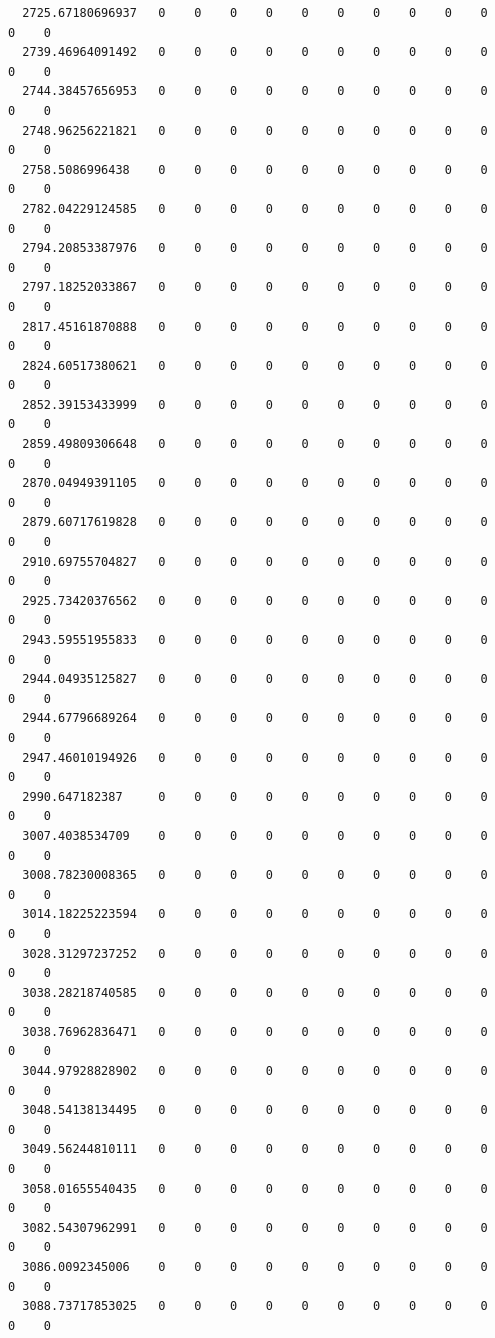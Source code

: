 \documentclass[
  letterpaper,
  DIV=11,
  numbers=noendperiod]{scrartcl}
\begin{document}
\begin{verbatim}
  2725.67180696937   0    0    0    0    0    0    0    0    0    0    0    0
  2739.46964091492   0    0    0    0    0    0    0    0    0    0    0    0
  2744.38457656953   0    0    0    0    0    0    0    0    0    0    0    0
  2748.96256221821   0    0    0    0    0    0    0    0    0    0    0    0
  2758.5086996438    0    0    0    0    0    0    0    0    0    0    0    0
  2782.04229124585   0    0    0    0    0    0    0    0    0    0    0    0
  2794.20853387976   0    0    0    0    0    0    0    0    0    0    0    0
  2797.18252033867   0    0    0    0    0    0    0    0    0    0    0    0
  2817.45161870888   0    0    0    0    0    0    0    0    0    0    0    0
  2824.60517380621   0    0    0    0    0    0    0    0    0    0    0    0
  2852.39153433999   0    0    0    0    0    0    0    0    0    0    0    0
  2859.49809306648   0    0    0    0    0    0    0    0    0    0    0    0
  2870.04949391105   0    0    0    0    0    0    0    0    0    0    0    0
  2879.60717619828   0    0    0    0    0    0    0    0    0    0    0    0
  2910.69755704827   0    0    0    0    0    0    0    0    0    0    0    0
  2925.73420376562   0    0    0    0    0    0    0    0    0    0    0    0
  2943.59551955833   0    0    0    0    0    0    0    0    0    0    0    0
  2944.04935125827   0    0    0    0    0    0    0    0    0    0    0    0
  2944.67796689264   0    0    0    0    0    0    0    0    0    0    0    0
  2947.46010194926   0    0    0    0    0    0    0    0    0    0    0    0
  2990.647182387     0    0    0    0    0    0    0    0    0    0    0    0
  3007.4038534709    0    0    0    0    0    0    0    0    0    0    0    0
  3008.78230008365   0    0    0    0    0    0    0    0    0    0    0    0
  3014.18225223594   0    0    0    0    0    0    0    0    0    0    0    0
  3028.31297237252   0    0    0    0    0    0    0    0    0    0    0    0
  3038.28218740585   0    0    0    0    0    0    0    0    0    0    0    0
  3038.76962836471   0    0    0    0    0    0    0    0    0    0    0    0
  3044.97928828902   0    0    0    0    0    0    0    0    0    0    0    0
  3048.54138134495   0    0    0    0    0    0    0    0    0    0    0    0
  3049.56244810111   0    0    0    0    0    0    0    0    0    0    0    0
  3058.01655540435   0    0    0    0    0    0    0    0    0    0    0    0
  3082.54307962991   0    0    0    0    0    0    0    0    0    0    0    0
  3086.0092345006    0    0    0    0    0    0    0    0    0    0    0    0
  3088.73717853025   0    0    0    0    0    0    0    0    0    0    0    0

\end{verbatim}
\end{document}
